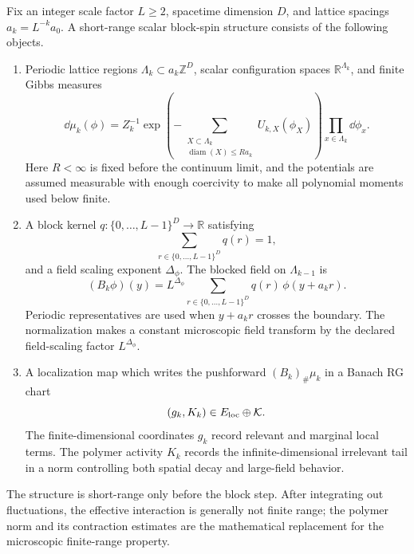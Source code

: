 \begin{definition}
\label{def:short-range-scalar-block-spin-structure}
Fix an integer scale factor \(L\geq2\), spacetime dimension \(D\), and
lattice spacings \(a_k=L^{-k}a_0\).  A short-range scalar block-spin structure
consists of the following objects.
\begin{enumerate}
  \item Periodic lattice regions
  \(\Lambda_k\subset a_k\mathbb Z^D\), scalar configuration spaces
  \(\mathbb R^{\Lambda_k}\), and finite Gibbs measures
  \begin{equation}
    \dd\mu_k(\phi)
    =
    Z_k^{-1}
    \exp\!\left(
      -\sum_{\substack{X\subset\Lambda_k\\
        \operatorname{diam}(X)\leq R a_k}}
      U_{k,X}(\phi_X)
    \right)
    \prod_{x\in\Lambda_k}\dd\phi_x .
    \label{eq:short-range-scalar-gibbs-measure}
  \end{equation}
  Here \(R<\infty\) is fixed before the continuum limit, and the potentials
  are assumed measurable with enough coercivity to make all polynomial
  moments used below finite.
  \item A block kernel \(q:\{0,\ldots,L-1\}^D\to\mathbb R\) satisfying
  \begin{equation}
    \sum_{r\in\{0,\ldots,L-1\}^D}q(r)=1 ,
    \label{eq:block-kernel-normalization}
  \end{equation}
  and a field scaling exponent \(\Delta_\phi\).  The blocked field on
  \(\Lambda_{k-1}\) is
  \begin{equation}
    (B_k\phi)(y)
    =
    L^{\Delta_\phi}
    \sum_{r\in\{0,\ldots,L-1\}^D}
      q(r)\,
      \phi(y+a_k r).
    \label{eq:ordinary-block-spin-map}
  \end{equation}
  Periodic representatives are used when \(y+a_kr\) crosses the boundary.
  The normalization makes a constant microscopic field transform by the
  declared field-scaling factor \(L^{\Delta_\phi}\).
  \item A localization map which writes the pushforward
  \((B_k)_\#\mu_k\) in a Banach RG chart
  \[
    (g_k,K_k)\in E_{\rm loc}\oplus\mathcal K .
  \]
  The finite-dimensional coordinates \(g_k\) record relevant and marginal
  local terms.  The polymer activity \(K_k\) records the infinite-dimensional
  irrelevant tail in a norm controlling both spatial decay and large-field
  behavior.
\end{enumerate}
The structure is short-range only before the block step.  After integrating out
fluctuations, the effective interaction is generally not finite range; the
polymer norm and its contraction estimates are the mathematical replacement
for the microscopic finite-range property.
\end{definition}

